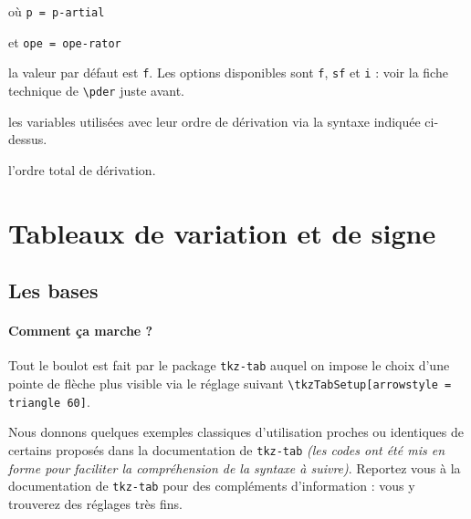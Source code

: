 \documentclass[12pt,a4paper]{article}
\makeatletter
\newcommand\env[1]{\texttt{#1}}
\newcommand\macro[1]{\env{\textbackslash{}#1}}
\theoremstyle{definition}
\newcommand\mwhyprefix[2]{%
	\texttt{#1 = #1-#2}%
}
\newcounter{paraexample}[subsubsection]
\newcommand\@newexample@abstract[2]{%
	\paragraph{%
		#1%
		\if\relax\detokenize{#2}\relax\else {} -- #2\fi%
	}%
}
\newcommand\newparaexample{\@ifstar{\@newparaexample@star}{\@newparaexample@no@star}}
\newcommand\@newparaexample@no@star[1]{%
	\refstepcounter{paraexample}%
	\@newexample@abstract{Exemple \theparaexample}{#1}%
}
\newcommand\@newparaexample@star[1]{%
	\@newexample@abstract{Exemple}{#1}%
}
\makeatother
\begin{document}
 où \quad \mwhyprefix{p}{artial}
                              et \mwhyprefix{ope}{rator}

\IDoption{} la valeur par défaut est \verb+f+. Les options disponibles sont \verb+f+, \verb+sf+ et \verb+i+ : voir la fiche technique de \macro{pder} juste avant.

 les variables utilisées avec leur ordre de dérivation via la syntaxe indiquée ci-dessus.

 l'ordre total de dérivation.

\section{Tableaux de variation et de signe}

\subsection{Les bases}

\paragraph{Comment ça marche ?}

Tout le boulot est fait par le package \verb+tkz-tab+ auquel on impose le choix d'une pointe de flèche plus visible via le réglage suivant \verb+\tkzTabSetup[arrowstyle = triangle 60]+.

\medskip

Nous donnons quelques exemples classiques d'utilisation proches ou identiques de certains proposés dans la documentation de \verb+tkz-tab+ \emph{(les codes ont été mis en forme pour faciliter la compréhension de la syntaxe à suivre)}.
Reportez vous à la documentation de \verb+tkz-tab+ pour des compléments d'information : vous y trouverez des réglages très fins.




\newparaexample{Avec des signes}

\begin{latexex-flat}
\end{latexex-flat}
\end{document}
